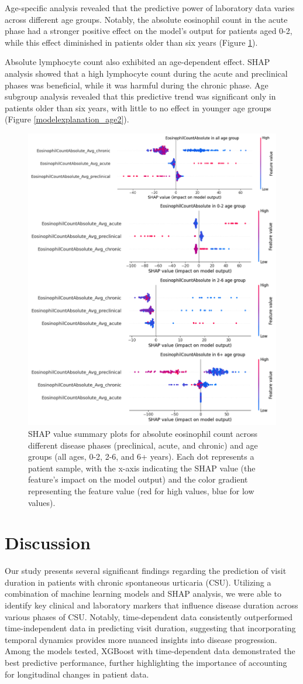 \documentclass[final,3p,times,authoryear]{elsarticle}
\begin{document}
Age-specific analysis revealed that the predictive power of laboratory data varies across different age groups. Notably, the absolute eosinophil count in the acute phase had a stronger positive effect on the model’s output for patients aged 0-2, while this effect diminished in patients older than six years (Figure \ref{modelexplanation_age}).

Absolute lymphocyte count also exhibited an age-dependent effect. SHAP analysis showed that a high lymphocyte count during the acute and preclinical phases was beneficial, while it was harmful during the chronic phase. Age subgroup analysis revealed that this predictive trend was significant only in patients older than six years, with little to no effect in younger age groups (Figure \ref{modelexplanation_age2}).
\begin{figure}[t]  
    \centering 
    \includegraphics[width=0.5\linewidth]{figures/modelexplanation_age.png}
    \caption{SHAP value summary plots for absolute eosinophil count across different disease phases (preclinical, acute, and chronic) and age groups (all ages, 0-2, 2-6, and 6+ years). Each dot represents a patient sample, with the x-axis indicating the SHAP value (the feature’s impact on the model output) and the color gradient representing the feature value (red for high values, blue for low values).}\label{modelexplanation_age}

\end{figure}


\section{Discussion}\label{Discussion}

Our study presents several significant findings regarding the prediction of visit duration in patients with chronic spontaneous urticaria (CSU). Utilizing a combination of machine learning models and SHAP analysis, we were able to identify key clinical and laboratory markers that influence disease duration across various phases of CSU. Notably, time-dependent data consistently outperformed time-independent data in predicting visit duration, suggesting that incorporating temporal dynamics provides more nuanced insights into disease progression. Among the models tested, XGBoost with time-dependent data demonstrated the best predictive performance, further highlighting the importance of accounting for longitudinal changes in patient data.
\end{document}

